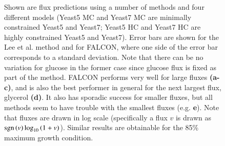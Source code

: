 \begin{figure}
\begin{tabular}{cc}
\\
\end{tabular}
\vspace{4mm}
\caption{
Shown are flux predictions using a number of methods and four
different models (Yeast5 MC and Yeast7 MC are minimally constrained
Yeast5 and Yeast7; Yeast5 HC and Yeast7 HC are highly constrained Yeast5
and Yeast7). Error bars are shown for the Lee et al. method and for
FALCON, where one side of the error bar corresponds to a standard
deviation. Note that there can be no variation for glucose in the
former case since glucose flux is fixed as part of the method. FALCON
performs very well for large fluxes \textbf{(a-c)}, and is also the best
performer in general for the next largest flux, glycerol \textbf{(d)}. It also
has sporadic success for smaller fluxes, but all methods seem to have
trouble with the smallest fluxes (e.g. \textbf{e}). Note that fluxes are drawn
in log scale (specifically a flux $v$ is drawn as $\operatorname{sgn}\left(v\right) \log_{10}{\left( 
1 + v\right)} $). Similar results are obtainable for the 85\% maximum growth
condition.}
\label{fig:FluxBars}
\end{figure}


